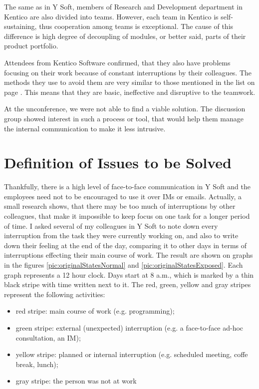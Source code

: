 \documentclass[11pt,singleside]{myfithesis2}
\begin{document}
The same as in Y Soft, members of Research and Development department in Kentico are also divided into teams. However, each team in Kentico is self-sustaining, thus cooperation among teams is exceptional. The cause of this difference is high degree of decoupling of modules, or better said, parts of their product portfolio.

Attendees from Kentico Software confirmed, that they also have problems focusing on their work because of constant interruptions by their colleagues. The methods they use to avoid them are very similar to those mentioned in the list on page \pageref{list:avoidingCommunication}. This means that they are basic, ineffective and disruptive to the teamwork.

At the unconference, we were not able to find a viable solution. The discussion group showed interest in such a process or tool, that would help them manage the internal communication to make it less intrusive.


	\section{Definition of Issues to be Solved}\label{issues}
Thankfully, there is a high level of face-to-face communication in Y Soft and the employees need not to be encouraged to use it over IMs or emails. Actually, a small research shows, that there may be too much of interruptions by other colleagues, that make it impossible to keep focus on one task for a longer period of time. I asked several of my colleagues in Y Soft to note down every interruption from the task they were currently working on, and also to write down their feeling at the end of the day, comparing it to other days in terms of interruptions effecting their main course of work. The result are shown on graphs in the figures \ref{pic:originalStatesNormal} and \ref{pic:originalStatesExposed}. Each graph represents a 12 hour clock. Days start at 8 a.m., which is marked by a thin black stripe with time written next to it. The red, green, yellow and gray stripes represent the following activities:
\begin{itemize}
	\item{red stripe:} main course of work (e.g. programming);
	\item{green stripe:} external (unexpected) interruption (e.g. a face-to-face ad-hoc consultation, an IM);
	\item{yellow stripe:} planned or internal interruption (e.g. scheduled meeting, coffe break, lunch);
	\item{gray stripe:} the person was not at work
\end{itemize}
\end{document}
